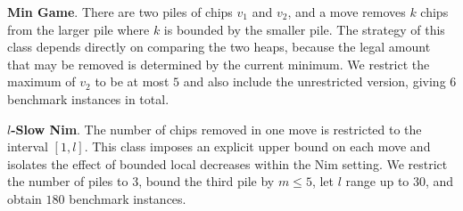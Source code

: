 \documentclass[review]{elsarticle}
\newcommand{\set}[1]{\{ #1 \}}
\newcommand{\tuple}[1]{\langle {#1} \rangle}
\newcommand{\true}{\top}
\newcommand{\statevar}{\mathcal{X}}
\newcommand{\act}{\mathcal{A}}
\newcommand{\constraint}{\mathcal{C}}
\newcommand{\estate}{\mathcal{E}}
\newcommand{\pre}{\mathtt{pre}}
\newcommand{\eff}{\mathtt{eff}}
\begin{document}
\textbf{Min Game}. There are two piles of chips $v_1$ and $v_2$, and a move removes $k$ chips from the larger pile where $k$ is bounded by the smaller pile.
The strategy of this class depends directly on comparing the two heaps, because the legal amount that may be removed is determined by the current minimum.
We restrict the maximum of $v_2$ to be at most $5$ and also include the unrestricted version, giving $6$ benchmark instances in total.

\textbf{$l$-Slow Nim}. The number of chips removed in one move is restricted to the interval $[1,l]$.
This class imposes an explicit upper bound on each move and isolates the effect of bounded local decreases within the Nim setting.
We restrict the number of piles to $3$, bound the third pile by $m \le 5$, let $l$ range up to $30$, and obtain $180$ benchmark instances.
\end{document}
